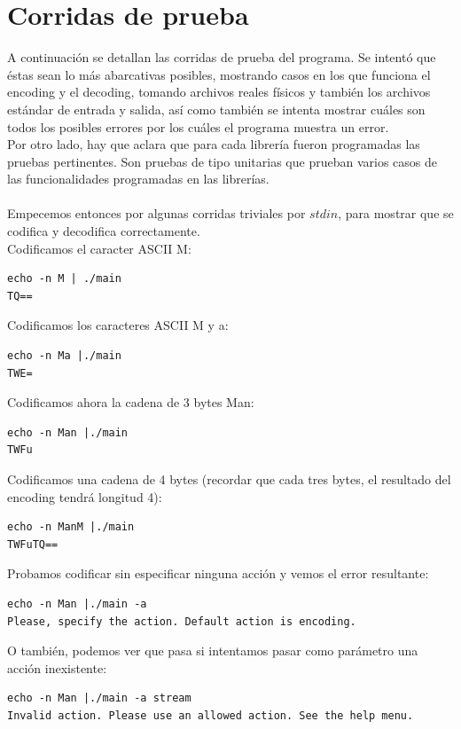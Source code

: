 \documentclass[11pt]{article}
\begin{document}
    \section*{Corridas de prueba}
        A continuación se detallan las corridas de prueba del programa. Se intentó que éstas sean lo más abarcativas posibles, mostrando casos en los que funciona el encoding y el decoding, tomando archivos reales físicos y también los archivos estándar de entrada y salida, así como también se intenta mostrar cuáles son todos los posibles errores por los cuáles el programa muestra un error.\\
        Por otro lado, hay que aclara que para cada librería fueron programadas las pruebas pertinentes. Son pruebas de tipo unitarias que prueban varios casos de las funcionalidades programadas en las librerías.\\
        \\
        Empecemos entonces por algunas corridas triviales por $stdin$, para mostrar que se codifica y decodifica correctamente.\\
        Codificamos el caracter ASCII M:
        \begin{verbatim}
echo -n M | ./main
TQ==
        \end{verbatim}
        Codificamos los caracteres ASCII M y a:
        \begin{verbatim}
echo -n Ma |./main
TWE=       
        \end{verbatim}
        Codificamos ahora la cadena de 3 bytes Man:
        \begin{verbatim}
echo -n Man |./main
TWFu        
        \end{verbatim}
        Codificamos una cadena de 4 bytes (recordar que cada tres bytes, el resultado del encoding tendrá longitud 4):
        \begin{verbatim}
echo -n ManM |./main
TWFuTQ==
        \end{verbatim}
        Probamos codificar sin especificar ninguna acción y vemos el error resultante:
        \begin{verbatim}
echo -n Man |./main -a
Please, specify the action. Default action is encoding.
        \end{verbatim}
        O también, podemos ver que pasa si intentamos pasar como parámetro una acción inexistente:
        \begin{verbatim}
echo -n Man |./main -a stream
Invalid action. Please use an allowed action. See the help menu.
        \end{verbatim}
\end{document}

